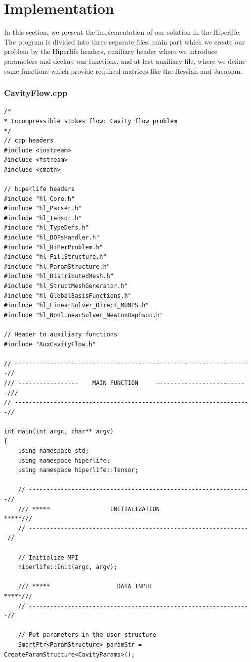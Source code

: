 \documentclass[]{article}
\begin{document}
\section{Implementation} \label{sec: imp}
In this section, we present the implementation of our solution in the Hiperlife. The program is divided into three separate files, main part which we create our problem by the Hiperlife headers, auxiliary header where we introduce parameters and declare our functions, and at last auxiliary file, where we define some functions which provide required matrices like the Hessian and Jacobian.
\subsubsection{CavityFlow.cpp} \label{sec: m.cpp}
\nolinenumbers
\begin{lstlisting}
/*
* Incompressible stokes flow: Cavity flow problem
*/
// cpp headers
#include <iostream>
#include <fstream>
#include <cmath>

// hiperlife headers
#include "hl_Core.h"
#include "hl_Parser.h"
#include "hl_Tensor.h"
#include "hl_TypeDefs.h"  
#include "hl_DOFsHandler.h"
#include "hl_HiPerProblem.h"
#include "hl_FillStructure.h"
#include "hl_ParamStructure.h"
#include "hl_DistributedMesh.h" 
#include "hl_StructMeshGenerator.h" 
#include "hl_GlobalBasisFunctions.h"
#include "hl_LinearSolver_Direct_MUMPS.h"
#include "hl_NonlinearSolver_NewtonRaphson.h"

// Header to auxiliary functions
#include "AuxCavityFlow.h"

// -------------------------------------------------------------------//
/// -----------------    MAIN FUNCTION     --------------------------///
// -------------------------------------------------------------------//

int main(int argc, char** argv)
{
	using namespace std;
	using namespace hiperlife;
	using namespace hiperlife::Tensor;
	
	// ---------------------------------------------------------------//
	/// *****                 INITIALIZATION                    *****///
	// ---------------------------------------------------------------//
	
	// Initialize MPI
	hiperlife::Init(argc, argv);
	
	/// *****                   DATA INPUT                      *****///
	// ---------------------------------------------------------------//
	
	// Put parameters in the user structure
	SmartPtr<ParamStructure> paramStr = CreateParamStructure<CavityParams>();
	

\end{lstlisting}
\end{document}
